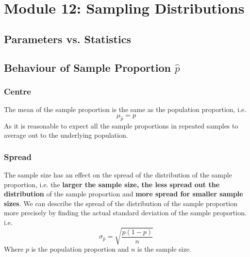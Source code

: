 \documentclass[12pt letter]{report}
\begin{document}
\chapter{Module 12: Sampling Distributions}

\section{Parameters vs. Statistics}





\section{Behaviour of Sample Proportion $\hat{p}$}

\subsection{Centre}

The mean of the sample proportion is the same as the population proportion, i.e.
\[
	\mu_{\hat{p}} = p
\]
As it is reasonable to expect all the sample proportions in repeated samples to average out to the underlying population.

\subsection{Spread}

The sample size has an effect on the spread of the distribution of the sample proportion, i.e. the \textbf{larger the sample
	size, the less spread out the distribution} of the sample proportion and \textbf{more spread for smaller sample
	sizes}. We can describe the spread of the distribution of the sample proportion more precisely by finding the actual
standard deviation of the sample proportion. i.e.
\[
	\sigma_{\hat{p}} = \sqrt{\frac{p \left( 1 - p \right) }{n}}
\]
Where $p$ is the population proportion and $n$ is the sample size.
\end{document}

